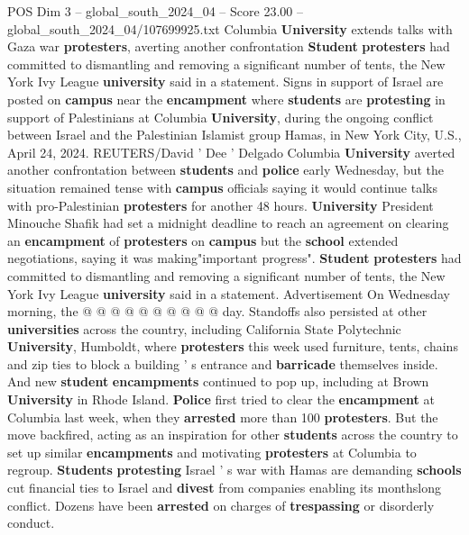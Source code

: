 \begin{textsample}{POS Dim 3 – global\_south\_2024\_04 – Score 23.00 – global\_south\_2024\_04/107699925.txt}  \label{ex:f3_pos_189}
Columbia \textbf{University} extends talks with Gaza war \textbf{protesters}, averting another confrontation \textbf{Student} \textbf{protesters} had committed to dismantling and removing a significant number of tents, the New York Ivy League \textbf{university} said in a statement.
Signs in support of Israel are posted on \textbf{campus} near the \textbf{encampment} where \textbf{students} are \textbf{protesting} in support of Palestinians at Columbia \textbf{University}, during the ongoing conflict between Israel and the Palestinian Islamist group Hamas, in New York City, U.S., April 24, 2024.
REUTERS/David ' Dee ' Delgado Columbia \textbf{University} averted another confrontation between \textbf{students} and \textbf{police} early Wednesday, but the situation remained tense with \textbf{campus} officials saying it would continue talks with pro-Palestinian \textbf{protesters} for another 48 hours. \textbf{University} President Minouche Shafik had set a midnight deadline to reach an agreement on clearing an \textbf{encampment} of \textbf{protesters} on \textbf{campus} but the \textbf{school} extended negotiations, saying it was making"important progress". \textbf{Student} \textbf{protesters} had committed to dismantling and removing a significant number of tents, the New York Ivy League \textbf{university} said in a statement.
Advertisement On Wednesday morning, the @ @ @ @ @ @ @ @ @ @ day.
Standoffs also persisted at other \textbf{universities} across the country, including California State Polytechnic \textbf{University}, Humboldt, where \textbf{protesters} this week used furniture, tents, chains and zip ties to block a building ' s entrance and \textbf{barricade} themselves inside.
And new \textbf{student} \textbf{encampments} continued to pop up, including at Brown \textbf{University} in Rhode Island. \textbf{Police} first tried to clear the \textbf{encampment} at Columbia last week, when they \textbf{arrested} more than 100 \textbf{protesters}.
But the move backfired, acting as an inspiration for other \textbf{students} across the country to set up similar \textbf{encampments} and motivating \textbf{protesters} at Columbia to regroup. \textbf{Students} \textbf{protesting} Israel ' s war with Hamas are demanding \textbf{schools} cut financial ties to Israel and \textbf{divest} from companies enabling its monthslong conflict.
Dozens have been \textbf{arrested} on charges of \textbf{trespassing} or disorderly conduct.

\end{textsample}
